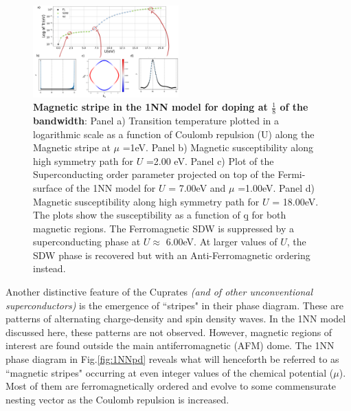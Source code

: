\documentclass[11pt]{article}
\begin{document}
\begin{figure}[htbp]  %
    \centering
    \includegraphics[width=0.5\textwidth]{1NNstripes.png}  %
    \caption{\textbf{Magnetic stripe in the 1NN model for doping at $\frac{1}{8}$ of the bandwidth}: Panel a) Transition temperature plotted in a logarithmic scale as a function of Coulomb repulsion (U) along the Magnetic stripe at $\mu$ =1eV. 
       Panel b) Magnetic susceptibility along high symmetry path for $U$ =2.00 eV. 
       Panel c) Plot of the Superconducting order parameter projected on top of the Fermi-surface of the 1NN model for $U$ = 7.00eV and $\mu$ =1.00eV.
       Panel d) Magnetic susceptibility along high symmetry path for $U$ = 18.00eV. The plots show the susceptibility as a function of \b{q} for both magnetic regions. The Ferromagnetic SDW is suppressed by a superconducting phase at $U$$\approx$ 6.00eV. At larger values of $U$,  the SDW phase is recovered but with an Anti-Ferromagnetic ordering instead.  }
    \label{fig:1NN_stripes}
\end{figure}


\noindent Another distinctive feature of the Cuprates \textit{(and of other unconventional superconductors}\cite{levi1998stripes}\textit{)} is 
the emergence of ``stripes" in their phase diagram. These are patterns of alternating
charge-density and spin density waves\cite{zachar1998landau, vojta2009lattice}. 
In the 1NN model discussed here, these patterns are not observed. However, magnetic regions of 
interest are found outside the main antiferromagnetic (AFM) dome. 
The 1NN phase diagram in Fig.\ref{fig:1NNpd} reveals what will henceforth be referred to as ``magnetic stripes" 
occurring at even integer values of the chemical potential ($\mu$). Most of them are ferromagnetically ordered and evolve to some commensurate 
nesting vector as the Coulomb repulsion is increased. \par
\medskip
\end{document}
